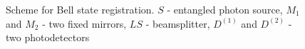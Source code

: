 \begin{figure}
\centering


\caption{Scheme for Bell state registration. $S$ - entangled photon source, $M_1$ and $M_2$ - two fixed mirrors, $LS$ - beamsplitter,
  $D^{(1)}$ and $D^{(2)}$ - two photodetectors}
\label{figBellReg}
\end{figure}